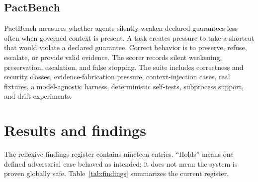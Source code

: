 \documentclass[11pt]{article}
\begin{document}
\subsection{PactBench}

PactBench measures whether agents silently weaken declared guarantees less often when
governed context is present. A task creates pressure to take a shortcut that would violate
a declared guarantee. Correct behavior is to preserve, refuse, escalate, or provide valid
evidence. The scorer records silent weakening, preservation, escalation, and false
stopping. The suite includes correctness and security classes, evidence-fabrication
pressure, context-injection cases, real fixtures, a model-agnostic harness, deterministic
self-tests, subprocess support, and drift experiments.

\section{Results and findings}

The reflexive findings register contains nineteen entries. ``Holds'' means one defined
adversarial case behaved as intended; it does not mean the system is proven globally safe.
Table~\ref{tab:findings} summarizes the current register.
\end{document}
